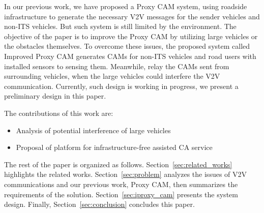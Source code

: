 In our previous work, we have proposed a Proxy CAM system,
using roadside infrastructure to generate the necessary V2V messages for the sender vehicles and non-ITS vehicles.
But such system is still limited by the environment.
The objective of the paper is to improve the Proxy CAM by utilizing large vehicles or the obstacles themselves.
To overcome these issues,
the proposed system called Improved Proxy CAM generates CAMs for non-ITS vehicles and road users with installed sensors to sensing them.
Meanwhile, relay the CAMs sent from surrounding vehicles, when the large vehicles could interfere the V2V communication.
Currently, such design is working in progress, we present a preliminary design in this paper.

The contributions of this work are:
\begin{itemize}
\item Analysis of potential interference of large vehicles
\item Proposal of platform for infrastructure-free assisted CA service
\end{itemize}

The rest of the paper is organized as follows.
Section~\ref{sec:related_works} highlights the related works.
Section~\ref{sec:problem} analyzes the issues of V2V communications and our previous work, Proxy CAM,
then summarizes the requirements of the solution.
Section~\ref{sec:iproxy_cam} presents the system design.
Finally, Section~\ref{sec:conclusion} concludes this paper.